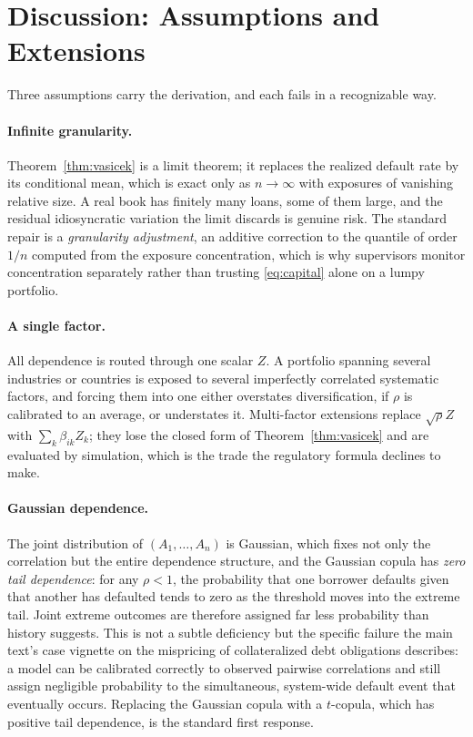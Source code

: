 \documentclass[11pt]{article}
\theoremstyle{remark}
\theoremstyle{definition}
\begin{document}
\section{Discussion: Assumptions and Extensions}
\label{sec:discussion}

Three assumptions carry the derivation, and each fails in a recognizable way.

\paragraph{Infinite granularity.} Theorem~\ref{thm:vasicek} is a limit theorem; it replaces the realized default rate by its conditional mean, which is exact only as $n\to\infty$ with exposures of vanishing relative size. A real book has finitely many loans, some of them large, and the residual idiosyncratic variation the limit discards is genuine risk. The standard repair is a \emph{granularity adjustment}, an additive correction to the quantile of order $1/n$ computed from the exposure concentration, which is why supervisors monitor concentration separately rather than trusting \eqref{eq:capital} alone on a lumpy portfolio.

\paragraph{A single factor.} All dependence is routed through one scalar $Z$. A portfolio spanning several industries or countries is exposed to several imperfectly correlated systematic factors, and forcing them into one either overstates diversification, if $\rho$ is calibrated to an average, or understates it. Multi-factor extensions replace $\sqrt{\rho}Z$ with $\sum_k \beta_{ik} Z_k$; they lose the closed form of Theorem~\ref{thm:vasicek} and are evaluated by simulation, which is the trade the regulatory formula declines to make.

\paragraph{Gaussian dependence.} The joint distribution of $(A_1,\dots,A_n)$ is Gaussian, which fixes not only the correlation but the entire dependence structure, and the Gaussian copula has \emph{zero tail dependence}: for any $\rho<1$, the probability that one borrower defaults given that another has defaulted tends to zero as the threshold moves into the extreme tail. Joint extreme outcomes are therefore assigned far less probability than history suggests. This is not a subtle deficiency but the specific failure the main text's case vignette on the mispricing of collateralized debt obligations describes: a model can be calibrated correctly to observed pairwise correlations and still assign negligible probability to the simultaneous, system-wide default event that eventually occurs. Replacing the Gaussian copula with a $t$-copula, which has positive tail dependence, is the standard first response.
\end{document}

